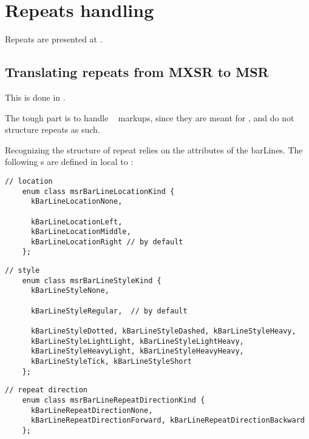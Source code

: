 
\chapter{Repeats handling}\label{Repeats handling}

Repeats are presented at .


\section{Translating repeats from MXSR to MSR}

This is done in \mxsrToMsr{}.

The tough part is to handle \mxml\  markups, since they are meant for \drawing, and do not structure repeats as such.

Recognizing the structure of repeat relies on the attributes of the barLines. The following \enumType s are defined in  local to :
\begin{lstlisting}[language=CPlusPlus]
    // location
    enum class msrBarLineLocationKind {
      kBarLineLocationNone,

      kBarLineLocationLeft,
      kBarLineLocationMiddle,
      kBarLineLocationRight // by default
    };
\end{lstlisting}

\begin{lstlisting}[language=CPlusPlus]
    // style
    enum class msrBarLineStyleKind {
      kBarLineStyleNone,

      kBarLineStyleRegular,  // by default

      kBarLineStyleDotted, kBarLineStyleDashed, kBarLineStyleHeavy,
      kBarLineStyleLightLight, kBarLineStyleLightHeavy,
      kBarLineStyleHeavyLight, kBarLineStyleHeavyHeavy,
      kBarLineStyleTick, kBarLineStyleShort
    };
\end{lstlisting}

\begin{lstlisting}[language=CPlusPlus]
    // repeat direction
    enum class msrBarLineRepeatDirectionKind {
      kBarLineRepeatDirectionNone,
      kBarLineRepeatDirectionForward, kBarLineRepeatDirectionBackward
    };
\end{lstlisting}

